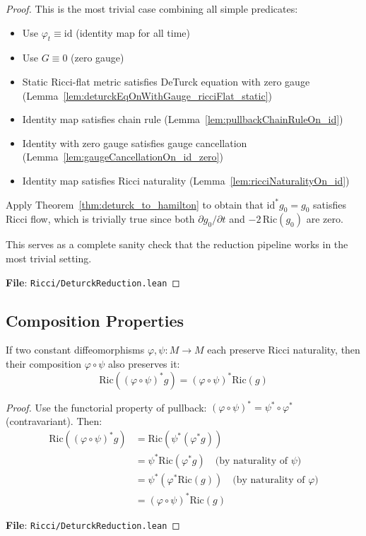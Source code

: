 \begin{proof}
\leanok
This is the most trivial case combining all simple predicates:
\begin{itemize}
\item Use $\varphi_t \equiv \mathrm{id}$ (identity map for all time)
\item Use $G \equiv 0$ (zero gauge)
\item Static Ricci-flat metric satisfies DeTurck equation with zero gauge (Lemma~\ref{lem:deturckEqOnWithGauge_ricciFlat_static})
\item Identity map satisfies chain rule (Lemma~\ref{lem:pullbackChainRuleOn_id})
\item Identity with zero gauge satisfies gauge cancellation (Lemma~\ref{lem:gaugeCancellationOn_id_zero})
\item Identity map satisfies Ricci naturality (Lemma~\ref{lem:ricciNaturalityOn_id})
\end{itemize}
Apply Theorem~\ref{thm:deturck_to_hamilton} to obtain that $\mathrm{id}^* g_0 = g_0$ satisfies Ricci flow, which is trivially true since both $\partial g_0/\partial t$ and $-2\,\mathrm{Ric}(g_0)$ are zero.

This serves as a complete sanity check that the reduction pipeline works in the most trivial setting.

\textbf{File}: \texttt{Ricci/DeturckReduction.lean}
\end{proof}

\subsection{Composition Properties}

\begin{lemma}
\label{lem:ricciNaturalityOn_const_comp}
\leanok
{}
If two constant diffeomorphisms $\varphi, \psi : M \to M$ each preserve Ricci naturality, then their composition $\varphi \circ \psi$ also preserves it:
\[ \mathrm{Ric}((\varphi \circ \psi)^* g) = (\varphi \circ \psi)^* \mathrm{Ric}(g) \]
\end{lemma}

\begin{proof}
\leanok
Use the functorial property of pullback: $(\varphi \circ \psi)^* = \psi^* \circ \varphi^*$ (contravariant).
Then:
\begin{align*}
\mathrm{Ric}((\varphi \circ \psi)^* g) &= \mathrm{Ric}(\psi^* (\varphi^* g)) \\
&= \psi^* \mathrm{Ric}(\varphi^* g) \quad \text{(by naturality of $\psi$)} \\
&= \psi^* (\varphi^* \mathrm{Ric}(g)) \quad \text{(by naturality of $\varphi$)} \\
&= (\varphi \circ \psi)^* \mathrm{Ric}(g)
\end{align*}

\textbf{File}: \texttt{Ricci/DeturckReduction.lean}
\end{proof}


